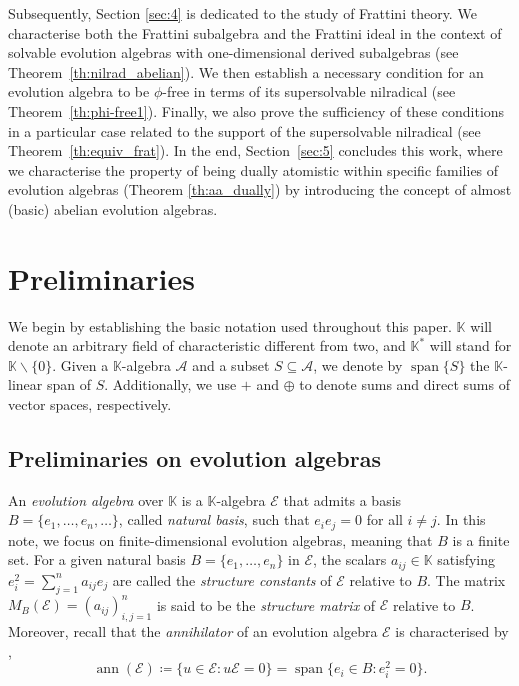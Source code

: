 \documentclass[12pt,reqno]{amsart}
\theoremstyle{definition}
\theoremstyle{remark}
\DeclareMathOperator{\ann}{ann}
\DeclareMathOperator{\spa}{span}
\numberwithin{equation}{section}
\begin{document}
Subsequently, Section \ref{sec:4} is dedicated to the study of Frattini theory. We characterise both the Frattini subalgebra and the Frattini ideal in the context of solvable evolution algebras with one-dimensional derived subalgebras (see Theorem~\ref{th:nilrad_abelian}). We then establish a necessary condition for an evolution algebra to be $\phi$-free in terms of its supersolvable nilradical (see Theorem~\ref{th:phi-free1}). Finally, we also prove the sufficiency of these conditions in a particular case related to the support of the supersolvable nilradical (see Theorem~\ref{th:equiv_frat}). In the end,
Section~\ref{sec:5} concludes this work, where we characterise the property of being dually atomistic within specific families of evolution algebras (Theorem \ref{th:aa_dually}) by introducing the concept of almost (basic) abelian evolution algebras.

\section{Preliminaries}\label{sec:2}
We begin by establishing the basic notation used throughout this paper. $\mathbb{K}$ will denote an arbitrary field of characteristic different from two, and $\mathbb{K}^*$ will stand for $\mathbb{K}\backslash\{0\}$. Given a $\mathbb{K}$-algebra $\mathcal{A}$ and a subset $S\subseteq\mathcal{A}$, we denote by $\spa\{S\}$ the $\mathbb{K}$-linear span of $S$. Additionally, we use $+$ and $\oplus$ to denote sums and direct sums of vector spaces, respectively.

\subsection{Preliminaries on evolution algebras}
An \textit{evolution algebra} over $\mathbb{K}$ is a $\mathbb{K}$-algebra $\mathcal{E}$ that admits a basis $B=\{e_1,\dots,e_n,\dots\}$, called \textit{natural basis}, such that $e_ie_j=0$ for all $i\neq j$. In this note, we focus on finite-dimensional evolution algebras, meaning that $B$ is a finite set. For a given natural basis $B=\{e_1,\dots,e_n\}$ in $\mathcal{E}$, the scalars $a_{ij}\in\mathbb{K}$ satisfying $e_i^2=\sum_{j=1}^na_{ij}e_j$ are called the \textit{structure constants} of $\mathcal{E}$ relative to $B$. The matrix $M_B(\mathcal{E})=(a_{ij})_{i,j=1}^n$ is said to be the \textit{structure matrix} of $\mathcal{E}$ relative to $B$. Moreover, recall that the \textit{annihilator} of an evolution algebra $\mathcal{E}$ is characterised by \cite[Proposition~1.5.3]{tesisyolanda},
\[\ann(\mathcal{E})\coloneqq\{u\in\mathcal{E}\colon u\mathcal{E}=0\}=\spa\{e_i\in B\colon e_i^2=0\}.\]
\end{document}

